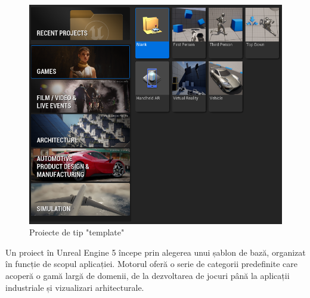 \begin{figure} [htp] 
\centering 
\includegraphics [width=12cm]
{continut/capitol3/figuri/UE_Templates.png} 
\caption{Proiecte de tip "template"} 
\label{fig:VR_Templates} 
\end{figure}

Un proiect în Unreal Engine 5 începe prin alegerea unui șablon de bază, organizat în funcție de scopul aplicației. Motorul oferă o serie de categorii predefinite care acoperă o gamă largă de domenii, de la dezvoltarea de jocuri până la aplicații industriale și vizualizari arhitecturale. 

